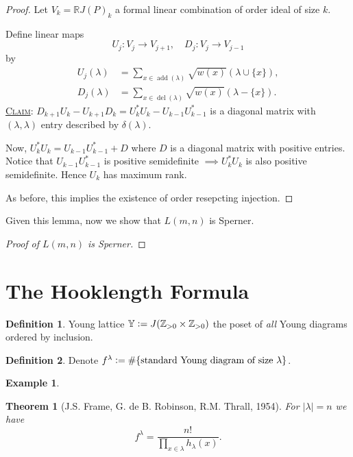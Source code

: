 \documentclass{report}
\newcommand{\R}{\mathbb{R}}
\newcommand{\Z}{\mathbb{Z}}
\def \del {\operatorname{del}}
\def \add {\operatorname{add}}
\newcommand{\defeq}{\vcentcolon=}
\newcommand{\fancyem}[1]{\underline{\textsc{#1}}}
\newtheorem{theorem}{Theorem}[section]
\theoremstyle{definition}
\newtheorem{definition}{Definition}[section]
\newtheorem{example}{Example}[section]
\theoremstyle{remark}
\numberwithin{equation}{section}
\begin{document}
\begin{proof}
    Let $V_k = \R J(P)_k$ a formal linear combination of order ideal of size $k$.

    Define linear maps \[
        U_j: V_j \to V_{j + 1}, \quad D_j: V_j \to V_{j - 1}    
    \] by \begin{align*}
        U_j(\lambda) & = \sum_{x \in \add(\lambda)} \sqrt{w(x)}\left(\lambda \cup \{x\}\right), \\
        D_j(\lambda) & = \sum_{x \in \del(\lambda)} \sqrt{w(x)}\left(\lambda - \{x\}\right).
    \end{align*}
    \fancyem{Claim}: $D_{k+1}U_k - U_{k+1}D_k = U^*_kU_k - U_{k-1}U^*_{k-1}$ is a diagonal matrix with $(\lambda, \lambda)$ entry described by $\delta(\lambda)$.

    Now, $U^*_kU_k = U_{k-1}U^*_{k-1} + D$ where $D$ is a diagonal matrix with positive entries. Notice that $U_{k-1}U^*_{k-1}$ is positive semidefinite $\implies U^*_kU_k$ is also positive semidefinite. Hence $U_k$ has maximum rank.

    As before, this implies the existence of order resepcting injection.
\end{proof}

Given this lemma, now we show that $L(m, n)$ is Sperner.
\begin{proof}[Proof of $L(m, n)$ is Sperner]
    
\end{proof}


\section{The Hooklength Formula}
\begin{definition}
    Young lattice $\mathbb{Y} \defeq J(\Z_{> 0} \times \Z_{> 0})$ the poset of \emph{all} Young diagrams ordered by inclusion.
\end{definition}

\begin{definition}
    Denote $f^\lambda \defeq \#\{\text{standard Young diagram of size } \lambda\}$.
\end{definition}

\begin{example}
    
\end{example}

\begin{theorem}[J.S. Frame, G. de B. Robinson, R.M. Thrall, 1954]
    For $|\lambda| = n$ we have \[
        f^\lambda = \frac{n!}{\prod_{x \in \lambda}h_\lambda(x)}.    
    \]
\end{theorem}
\end{document}
